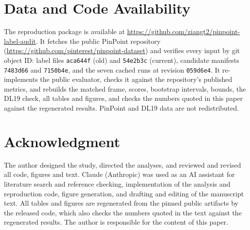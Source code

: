 \documentclass[conference]{IEEEtran}
\begin{document}
\section*{Data and Code Availability}
The reproduction package is available at \url{https://github.com/ziangt2/pinpoint-label-audit}. It fetches the public PinPoint repository (\url{https://github.com/pinterest/pinpoint-dataset}) and verifies every input by git object ID: label files \texttt{aca644f} (old) and \texttt{54e2b3c} (current), candidate manifests \texttt{7483d66} and \texttt{7150b4e}, and the seven cached runs at revision \texttt{059d6e4}. It re-implements the public evaluator, checks it against the repository's published metrics, and rebuilds the matched frame, scores, bootstrap intervals, bounds, the DL19 check, all tables and figures, and checks the numbers quoted in this paper against the regenerated results. PinPoint and DL19 data are not redistributed.

\section*{Acknowledgment}
The author designed the study, directed the analyses, and reviewed and revised all code, figures and text. Claude (Anthropic) was used as an AI assistant for literature search and reference checking, implementation of the analysis and reproduction code, figure generation, and drafting and editing of the manuscript text. All tables and figures are regenerated from the pinned public artifacts by the released code, which also checks the numbers quoted in the text against the regenerated results. The author is responsible for the content of this paper.



\end{document}
